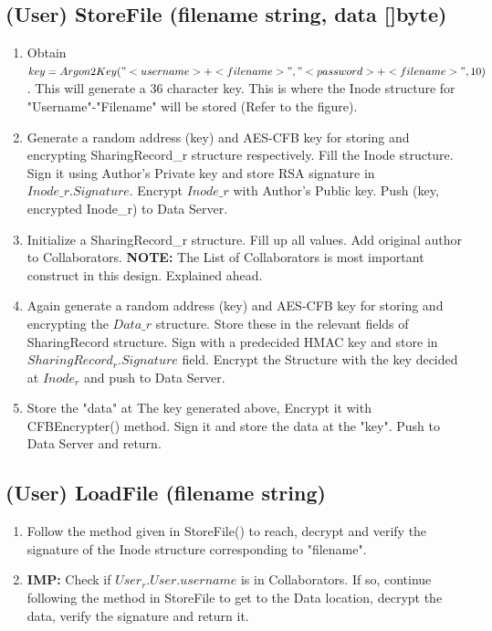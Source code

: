 \documentclass[a4paper, 12pt]{scrartcl}
\begin{document}
\subsection{(User) StoreFile (filename string, data []byte)}
\begin{enumerate}
	\itemsep0em
	\item Obtain $key = Argon2Key("<username>+<filename>", "<password>+<filename>", 10)$. This will generate a 36 character key. This is where the Inode structure for "Username"-"Filename" will be stored (Refer to the figure).
	\item Generate a random address (key) and AES-CFB key for storing and encrypting SharingRecord\_r structure respectively. Fill the Inode structure. Sign it using Author's Private key and store RSA signature in $Inode\_r.Signature$. Encrypt $Inode\_r$ with Author's Public key. Push (key, encrypted Inode\_r) to Data Server.
	\item Initialize a SharingRecord\_r structure. Fill up all values. Add original author to Collaborators. \textbf{NOTE:} The List of Collaborators is most important construct in this design. Explained ahead.
	\item Again generate a random address (key) and AES-CFB key for storing and encrypting the $Data\_r$ structure. Store these in the relevant fields of SharingRecord structure. Sign with a predecided HMAC key and store in $SharingRecord_r.Signature$ field. Encrypt the Structure with the key decided at $Inode_r$ and push to Data Server.
	\item Store the "data" at The key generated above, Encrypt it with CFBEncrypter() method. Sign it and store the data at the "key". Push to Data Server and return. 
\end{enumerate}

\subsection{(User) LoadFile (filename string)}
\begin{enumerate}
	\itemsep0em
	\item Follow the method given in StoreFile() to reach, decrypt and verify the signature of the Inode structure corresponding to "filename". 
	\item \textbf{IMP:} Check if $User_r.User.username$ is in Collaborators. If so, continue following the method in StoreFile to get to the Data location, decrypt the data, verify the signature and return it.
\end{enumerate}
\end{document}
